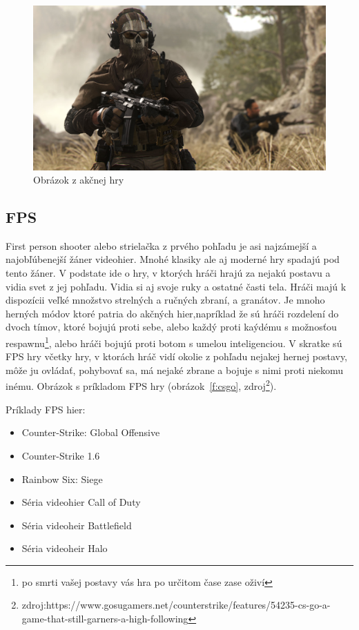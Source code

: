 \documentclass[10pt,oneside,slovak,a4paper]{article}
\begin{document}
\begin{figure}[tbh]
\centering
\includegraphics[scale=0.1]{mw2.jpg}
\caption{Obrázok z akčnej hry}
\label{f:akcne}
\end{figure}



\subsection{FPS} \label{zanre:fps}

First person shooter alebo strielačka z prvého pohľadu je asi najzámejší a najobľúbenejší žáner videohier. Mnohé klasiky ale aj moderné hry spadajú pod tento žáner. V podstate ide o hry, v ktorých hráči hrajú za nejakú postavu a vidia svet z jej pohľadu. Vidia si aj svoje ruky a ostatné časti tela. Hráči majú k dispozícii veľké množstvo strelných a ručných zbraní, a granátov. Je mnoho herných módov ktoré patria do akčných hier,napríklad že sú hráči rozdelení do dvoch tímov, ktoré bojujú proti sebe, alebo každý proti kaýdému s možnosťou respawnu\footnote{po smrti vašej postavy vás hra po určitom čase zase oživí}, alebo hráči bojujú proti botom s umelou inteligenciou. V skratke sú FPS hry včetky hry, v ktorách hráč vidí okolie z pohľadu nejakej hernej postavy, môže ju ovládať, pohybovať sa, má nejaké zbrane a bojuje s nimi proti niekomu inému. Obrázok s príkladom FPS hry (obrázok~\ref{f:csgo}, zdroj\footnote{zdroj:https://www.gosugamers.net/counterstrike/features/54235-cs-go-a-game-that-still-garners-a-high-following}). 

Príklady FPS hier:
\begin{itemize}
\item Counter-Strike: Global Offensive
\item Counter-Strike 1.6
\item Rainbow Six: Siege
\item Séria videohier Call of Duty
\item Séria videoheir Battlefield
\item Séria videoheir Halo
\end{itemize}
\end{document}
